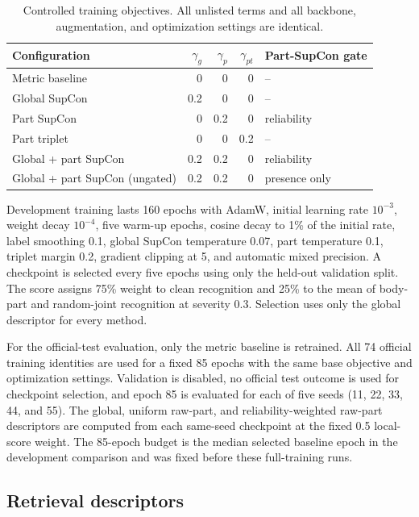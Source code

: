\documentclass[pdflatex,iicol,sn-apa]{sn-jnl}
\begin{document}
\begin{table}[t]
\centering
\caption{Controlled training objectives. All unlisted terms and all backbone,
augmentation, and optimization settings are identical.}
\label{tab:objectives}
\small
\begin{tabular}{lrrrl}
\toprule
Configuration & $\gamma_g$ & $\gamma_p$ & $\gamma_{pt}$ & Part-SupCon gate \\
\midrule
Metric baseline & 0 & 0 & 0 & -- \\
Global SupCon & 0.2 & 0 & 0 & -- \\
Part SupCon & 0 & 0.2 & 0 & reliability \\
Part triplet & 0 & 0 & 0.2 & -- \\
Global + part SupCon & 0.2 & 0.2 & 0 & reliability \\
Global + part SupCon (ungated) & 0.2 & 0.2 & 0 & presence only \\
\bottomrule
\end{tabular}
\end{table}

Development training lasts 160 epochs with AdamW, initial learning rate $10^{-3}$, weight
decay $10^{-4}$, five warm-up epochs, cosine decay to 1\% of the initial rate,
label smoothing 0.1, global SupCon temperature 0.07, part temperature 0.1,
triplet margin 0.2, gradient clipping at 5, and automatic mixed precision. A
checkpoint is selected every five epochs using only the held-out validation
split. The score assigns 75\% weight to clean recognition and 25\% to the mean
of body-part and random-joint recognition at severity 0.3. Selection uses only
the global descriptor for every method.

For the official-test evaluation, only the metric baseline is retrained. All 74
official training identities are used for a fixed 85 epochs with the same base
objective and optimization settings. Validation is disabled, no official test
outcome is used for checkpoint selection, and epoch 85 is evaluated for each of
five seeds (11, 22, 33, 44, and 55). The global, uniform raw-part, and
reliability-weighted raw-part descriptors are computed from each same-seed
checkpoint at the fixed 0.5 local-score weight. The 85-epoch budget is the
median selected baseline epoch in the development comparison and was fixed
before these full-training runs.

\subsection{Retrieval descriptors}
\end{document}
